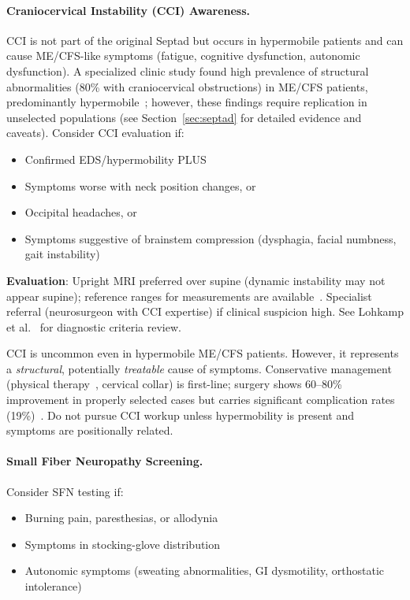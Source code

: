 \paragraph{Craniocervical Instability (CCI) Awareness.}
CCI is not part of the original Septad but occurs in hypermobile patients and can cause ME/CFS-like symptoms (fatigue, cognitive dysfunction, autonomic dysfunction). A specialized clinic study found high prevalence of structural abnormalities (80\% with craniocervical obstructions) in ME/CFS patients, predominantly hypermobile~\cite{Bragee2020}; however, these findings require replication in unselected populations (see Section~\ref{sec:septad} for detailed evidence and caveats). Consider CCI evaluation if:

\begin{itemize}
    \item Confirmed EDS/hypermobility PLUS
    \item Symptoms worse with neck position changes, or
    \item Occipital headaches, or
    \item Symptoms suggestive of brainstem compression (dysphagia, facial numbness, gait instability)
\end{itemize}

\textbf{Evaluation}: Upright MRI preferred over supine (dynamic instability may not appear supine); reference ranges for measurements are available~\cite{Nicholson2023}. Specialist referral (neurosurgeon with CCI expertise) if clinical suspicion high. See Lohkamp et al.~\cite{Lohkamp2022} for diagnostic criteria review.

\begin{warning}
CCI is uncommon even in hypermobile ME/CFS patients. However, it represents a \emph{structural}, potentially \emph{treatable} cause of symptoms. Conservative management (physical therapy~\cite{Russek2023}, cervical collar) is first-line; surgery shows 60--80\% improvement in properly selected cases but carries significant complication rates (19\%)~\cite{Henderson2024}. Do not pursue CCI workup unless hypermobility is present and symptoms are positionally related.
\end{warning}

\paragraph{Small Fiber Neuropathy Screening.}
Consider SFN testing if:
\begin{itemize}
    \item Burning pain, paresthesias, or allodynia
    \item Symptoms in stocking-glove distribution
    \item Autonomic symptoms (sweating abnormalities, GI dysmotility, orthostatic intolerance)
\end{itemize}


